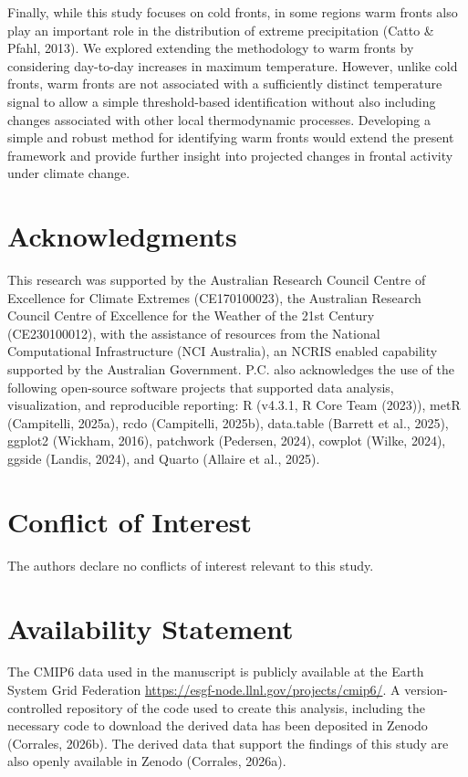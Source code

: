 \documentclass[
]{agujournal2019}
\begin{document}
Finally, while this study focuses on cold fronts, in some regions warm
fronts also play an important role in the distribution of extreme
precipitation (Catto \& Pfahl, 2013). We explored extending the
methodology to warm fronts by considering day-to-day increases in
maximum temperature. However, unlike cold fronts, warm fronts are not
associated with a sufficiently distinct temperature signal to allow a
simple threshold-based identification without also including changes
associated with other local thermodynamic processes. Developing a simple
and robust method for identifying warm fronts would extend the present
framework and provide further insight into projected changes in frontal
activity under climate change.

\section{Acknowledgments}\label{acknowledgments}

This research was supported by the Australian Research Council Centre of
Excellence for Climate Extremes (CE170100023), the Australian Research
Council Centre of Excellence for the Weather of the 21st Century
(CE230100012), with the assistance of resources from the National
Computational Infrastructure (NCI Australia), an NCRIS enabled
capability supported by the Australian Government. P.C. also
acknowledges the use of the following open-source software projects that
supported data analysis, visualization, and reproducible reporting: R
(v4.3.1, R Core Team (2023)), metR (Campitelli, 2025a), rcdo
(Campitelli, 2025b), data.table (Barrett et al., 2025), ggplot2
(Wickham, 2016), patchwork (Pedersen, 2024), cowplot (Wilke, 2024),
ggside (Landis, 2024), and Quarto (Allaire et al., 2025).

\section{Conflict of Interest}\label{conflict-of-interest}

The authors declare no conflicts of interest relevant to this study.

\section{Availability Statement}\label{availability-statement}

The CMIP6 data used in the manuscript is publicly available at the Earth
System Grid Federation \url{https://esgf-node.llnl.gov/projects/cmip6/}.
A version-controlled repository of the code used to create this
analysis, including the necessary code to download the derived data has
been deposited in Zenodo (Corrales, 2026b). The derived data that
support the findings of this study are also openly available in Zenodo
(Corrales, 2026a).
\end{document}
